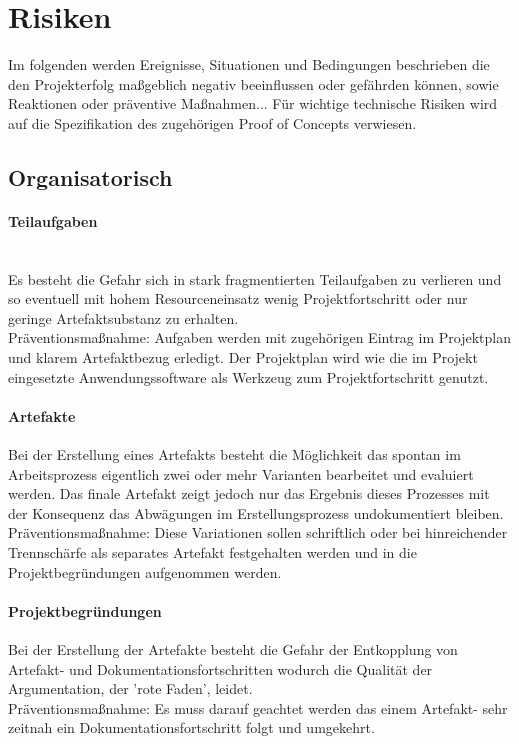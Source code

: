 \documentclass[11pt,oneside,a4paper,notitlepage]{article}
\begin{document}
%
\section{Risiken}
%
Im folgenden werden Ereignisse, Situationen und Bedingungen beschrieben die den Projekterfolg maßgeblich negativ beeinflussen oder gefährden können, sowie Reaktionen oder präventive Maßnahmen... Für wichtige technische Risiken wird auf die Spezifikation des zugehörigen Proof of Concepts verwiesen.


\subsection{Organisatorisch}


\paragraph{Teilaufgaben}\\
Es besteht die Gefahr sich in stark fragmentierten Teilaufgaben zu verlieren und so eventuell mit hohem Resourceneinsatz wenig Projektfortschritt oder nur geringe Artefaktsubstanz zu erhalten.\\
Präventionsmaßnahme: Aufgaben werden mit zugehörigen Eintrag im Projektplan und klarem Artefaktbezug erledigt. Der Projektplan wird wie die im Projekt eingesetzte Anwendungssoftware als Werkzeug zum Projektfortschritt genutzt.

\paragraph{Artefakte}
Bei der Erstellung eines Artefakts besteht die Möglichkeit das spontan im Arbeitsprozess eigentlich zwei oder mehr Varianten bearbeitet und evaluiert werden. Das finale Artefakt zeigt jedoch
nur das Ergebnis dieses Prozesses mit der Konsequenz das Abwägungen im Erstellungsprozess undokumentiert bleiben.\\
Präventionsmaßnahme: Diese Variationen sollen schriftlich oder bei hinreichender Trennschärfe als separates Artefakt festgehalten werden und in die Projektbegründungen aufgenommen werden.

%
\paragraph{Projektbegründungen}
Bei der Erstellung der Artefakte besteht die Gefahr der Entkopplung von Artefakt- und Dokumentationsfortschritten wodurch die Qualität der Argumentation, der 'rote Faden', leidet.\\
Präventionsmaßnahme: Es muss darauf geachtet werden das einem Artefakt- sehr zeitnah ein Dokumentationsfortschritt folgt und umgekehrt.
\end{document}
